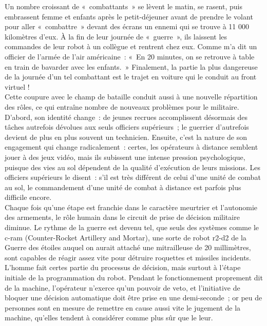 \documentclass[8pt]{article}
\begin{document}
Un nombre croissant de «~combattants~» se lèvent le matin, se rasent, puis embrassent femme et enfants après le petit-déjeuner avant de prendre le volant pour aller «~combattre~» devant des écrans un ennemi qui se trouve à 11 000 kilomètres d’eux. À la fin de leur journée de «~guerre~», ils laissent les commandes de leur robot à un collègue et rentrent chez eux. Comme m’a dit un officier de l’armée de l’air américaine~: «~En 20 minutes, on se retrouve à table en train de bavarder avec les enfants.~» Finalement, la partie la plus dangereuse de la journée d’un tel combattant est le trajet en voiture qui le conduit au front virtuel !\\

Cette coupure avec le champ de bataille conduit aussi à une nouvelle répartition des rôles, ce qui entraîne nombre de nouveaux problèmes pour le militaire. D’abord, son identité change~: de jeunes recrues accomplissent désormais des tâches autrefois dévolues aux seuls officiers supérieurs~; le guerrier d’autrefois devient de plus en plus souvent un technicien. Ensuite, c’est la nature de son engagement qui change radicalement~: certes, les opérateurs à distance semblent jouer à des jeux vidéo, mais ils subissent une intense pression psychologique, puisque des vies au sol dépendent de la qualité d’exécution de leurs missions. Les officiers supérieurs le disent~: s’il est très différent de celui d’une unité de combat au sol, le commandement d’une unité de combat à distance est parfois plus difficile encore.\\

Chaque fois qu’une étape est franchie dans le caractère meurtrier et l’autonomie des armements, le rôle humain dans le circuit de prise de décision militaire diminue. Le rythme de la guerre est devenu tel, que seuls des systèmes comme le c-ram (Counter-Rocket Artillery and Mortar), une sorte de robot r2-d2 de la Guerre des étoiles auquel on aurait attaché une mitrailleuse de 20 millimètres, sont capables de réagir assez vite pour détruire roquettes et missiles incidents. L’homme fait certes partie du processus de décision, mais surtout à l’étape initiale de la programmation du robot. Pendant le fonctionnement proprement dit de la machine, l’opérateur n’exerce qu’un pouvoir de veto, et l’initiative de bloquer une décision automatique doit être prise en une demi-seconde~; or peu de personnes sont en mesure de remettre en cause aussi vite le jugement de la machine, qu’elles tendent à considérer comme plus sûr que le leur.\\
\end{document}

